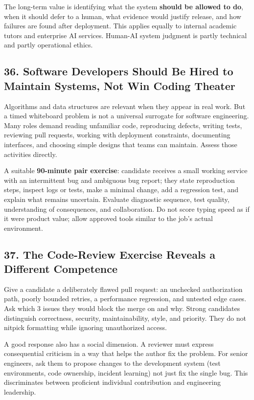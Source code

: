 The long-term value is identifying what the system \textbf{should be allowed to do}, when it should defer to a human, what evidence would justify release, and how failures are found after deployment. This applies equally to internal academic tutors and enterprise AI services. Human-AI system judgment is partly technical and partly operational ethics.

\subsection*{36. Software Developers Should Be Hired to Maintain Systems, Not Win Coding Theater}

Algorithms and data structures are relevant when they appear in real work. But a timed whiteboard problem is not a universal surrogate for software engineering. Many roles demand reading unfamiliar code, reproducing defects, writing tests, reviewing pull requests, working with deployment constraints, documenting interfaces, and choosing simple designs that teams can maintain. Assess those activities directly.

A suitable \textbf{90-minute pair exercise}: candidate receives a small working service with an intermittent bug and ambiguous bug report; they state reproduction steps, inspect logs or tests, make a minimal change, add a regression test, and explain what remains uncertain. Evaluate diagnostic sequence, test quality, understanding of consequences, and collaboration. Do not score typing speed as if it were product value; allow approved tools similar to the job's actual environment.

\subsection*{37. The Code-Review Exercise Reveals a Different Competence}

Give a candidate a deliberately flawed pull request: an unchecked authorization path, poorly bounded retries, a performance regression, and untested edge cases. Ask which 3 issues they would block the merge on and why. Strong candidates distinguish correctness, security, maintainability, style, and priority. They do not nitpick formatting while ignoring unauthorized access.

A good response also has a social dimension. A reviewer must express consequential criticism in a way that helps the author fix the problem. For senior engineers, ask them to propose changes to the development system (test environments, code ownership, incident learning) not just fix the single bug. This discriminates between proficient individual contribution and engineering leadership.

